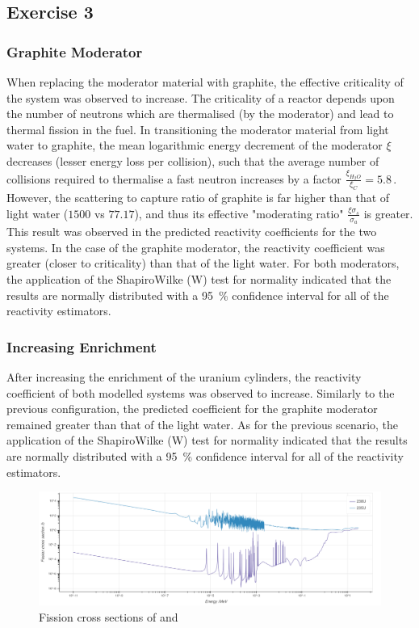 \documentclass{article}
\begin{document}
  \subsection{Exercise 3}
    \subsubsection{Graphite Moderator}
    When replacing the moderator material with graphite, the effective criticality of the system was observed to increase. The criticality of a reactor depends upon the number of neutrons which are thermalised (by the moderator) and lead to thermal fission in the fuel. In transitioning the moderator material from light water to graphite, the mean logarithmic energy decrement of the moderator $\xi$ decreases (lesser energy loss per collision), such that the average number of collisions required to thermalise a fast neutron increases by a factor $\frac{\xi_{H_2O}}{\xi_{C}}=5.8\,.$
    However, the scattering to capture ratio of graphite is far higher than that of light water ($1500$ vs $77.17$), and thus its effective "moderating ratio" $\frac{\xi\sigma_{s}}{\sigma_{a}}$ is greater. This result was observed in the predicted reactivity coefficients for the two systems. In the case of the graphite moderator, the reactivity coefficient was greater (closer to criticality) than that of the light water.
    For both moderators, the application of the Shapiro\textendash Wilke (W) test for normality indicated that the results are normally distributed with a \SI{95}{\percent} confidence interval for all of the reactivity estimators.

    \subsubsection{Increasing Enrichment}
    After increasing the enrichment of the uranium cylinders, the reactivity coefficient of both modelled systems was observed to increase. Similarly to the previous configuration, the predicted coefficient for the graphite moderator remained greater than that of the light water.
    As for the previous scenario, the application of the Shapiro\textendash Wilke (W) test for normality indicated that the results are normally distributed with a \SI{95}{\percent} confidence interval for all of the reactivity estimators.

    \begin{figure}
      \includegraphics[width=\textwidth]{cross_sections.png}
      \caption{Fission cross sections of  and }
      \label{fig:cross_sections}
    \end{figure}
\end{document}

